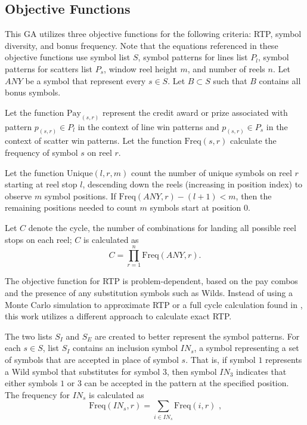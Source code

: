 \documentclass[conference]{IEEEtran}
\begin{document}
\subsection{Objective Functions}
This GA utilizes three objective functions for the following criteria: RTP, symbol diversity, and bonus frequency.
Note that the equations referenced in these objective functions use symbol list $S$, symbol patterns for lines list $P_l$, symbol patterns for scatters list $P_s$, window reel height $m$, and number of reels $n$.
Let $ANY$ be a symbol that represent every $s \in S$.
Let $B \subset S$ such that $B$ contains all bonus symbols.
\par
Let the function $\text{Pay}_{(s,r)}$ represent the credit award or prize associated with pattern $p_{(s,r)} \in P_l$ in the context of line win patterns and $p_{(s,r)} \in P_s$ in the context of scatter win patterns. 
Let the function $\text{Freq}(s,r)$ calculate the frequency of symbol $s$ on reel $r$.
\par
Let the function $\text{Unique}(l,r,m)$ count the number of unique symbols on reel $r$ starting at reel stop $l$, descending down the reels (increasing in position index) to observe $m$ symbol positions.
If $\text{Freq}(ANY,r) - (l + 1) < m$, then the remaining positions needed to count $m$ symbols start at position $0$.
\par
Let $C$ denote the cycle, the number of combinations for landing all possible reel stops on each reel; $C$ is calculated as 
\begin{equation}
C = \prod_{r=1}^{n} \text{Freq}(ANY,r).
\end{equation}
\par
The objective function for RTP is problem-dependent, based on the pay combos and the presence of any substitution symbols such as Wilds.
Instead of using a Monte Carlo simulation to approximate RTP or a full cycle calculation found in \cite{keremedchiev2017slot}, this work utilizes a different approach to calculate exact RTP.
\par
The two lists $S_I$ and $S_E$ are created to better represent the symbol patterns.
For each $s \in S$, list $S_I$ contains an inclusion symbol $IN_s$, a symbol representing a set of symbols that are accepted in place of symbol $s$.
That is, if symbol $1$ represents a Wild symbol that substitutes for symbol $3$, then symbol $IN_3$ indicates that either symbols $1$ or $3$ can be accepted in the pattern at the specified position.
The frequency for $IN_s$ is calculated as 
\begin{equation}
\text{Freq}(IN_s,r) = \sum_{i \in IN_s} \text{Freq}(i,r)\text{ ,}
\end{equation}
\end{document}
